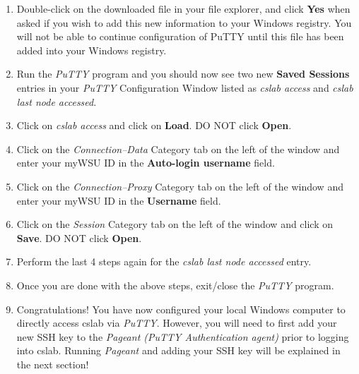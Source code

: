 \documentclass[12pt]{article}
\begin{document}
\begin{flushleft}
\begin{enumerate}
  \item Double-click on the downloaded file in your file explorer, and click \textbf{Yes} when asked if you wish to add this new information to your Windows registry. You will not be able to continue configuration of PuTTY until this file has been added into your Windows registry.
  \item Run the \textit{PuTTY} program and you should now see two new \textbf{Saved Sessions} entries in your \textit{PuTTY} Configuration Window listed as \textit{cslab access} and \textit{cslab last node accessed}.
  \item Click on \textit{cslab access} and click on \textbf{Load}. DO NOT click \textbf{Open}.
  \item Click on the \textit{Connection--Data} Category tab on the left of the window and enter your myWSU ID in the \textbf{Auto-login username} field.
  \item Click on the \textit{Connection--Proxy} Category tab on the left of the window and enter your myWSU ID in the \textbf{Username} field.
  \item Click on the \textit{Session} Category tab on the left of the window and click on \textbf{Save}. DO NOT click \textbf{Open}.
  \item Perform the last 4 steps again for the \textit{cslab last node accessed} entry.
  \item Once you are done with the above steps, exit/close the \textit{PuTTY} program.
  \item Congratulations! You have now configured your local Windows computer to directly access cslab via \textit{PuTTY}. However, you will need to first add your new SSH key to the \textit{Pageant (PuTTY Authentication agent)} prior to logging into cslab. Running \textit{Pageant} and adding your SSH key will be explained in the next section!
\end{enumerate}


\end{flushleft}
\end{document}
